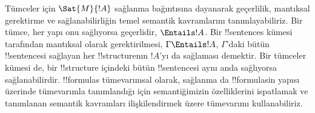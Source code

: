 Tümceler için $\Sat{M}{!A}$ sağlanma bağıntısına dayanarak geçerlilik,
mantıksal gerektirme ve sağlanabilirliğin temel semantik kavramlarını
tanımlayabiliriz. Bir tümce, her yapı onu sağlıyorsa geçerlidir,
$\Entails !A$. Bir !!{sentence}s kümesi tarafından mantıksal olarak
gerektirilmesi, $\Gamma \Entails !A$, $\Gamma$'daki bütün !!{sentence}s{}i
sağlayan her !!{structure}{}nın $!A$'yı da sağlaması demektir. Bir tümceler
kümesi de, bir !!{structure} içindeki bütün !!{sentence}s{}i aynı anda
sağlıyorsa sağlanabilirdir. !!{formula}s tümevarımsal olarak, sağlanma da
!!{formula}s{}in yapısı üzerinde tümevarımla tanımlandığı için semantiğimizin
özelliklerini ispatlamak ve tanımlanan semantik kavramları ilişkilendirmek
üzere tümevarımı kullanabiliriz.




